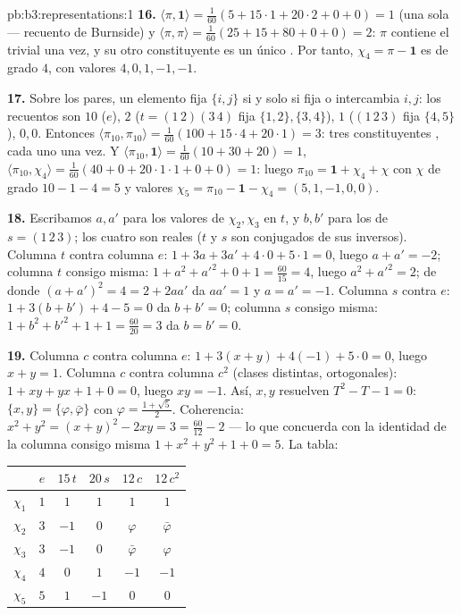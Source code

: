 \begin{solution}{pb:b3:representations:1}
\textbf{16.} $\langle\pi, \mathbf 1\rangle = \frac1{60}(5 +
15\cdot1 + 20\cdot2 + 0 + 0) = 1$ (una sola
 --- recuento de Burnside) y
$\langle\pi, \pi\rangle = \frac1{60}(25 + 15 + 80 +
0 + 0) = 2$: $\pi$ contiene el
 trivial una vez, y
su otro constituyente es un único
. Por tanto,
$\chi_4 = \pi
- \mathbf 1$ es  de
grado $4$, con valores $4, 0,
1, -1, -1$.

\textbf{17.} Sobre los pares, un elemento fija $\{i,j\}$ si y solo si
fija o intercambia $i, j$: los recuentos son $10$ ($e$), $2$ ($t =
(1\,2)(3\,4)$ fija $\{1,2\}, \{3,4\}$), $1$ ($(1\,2\,3)$ fija
$\{4,5\}$), $0, 0$. Entonces $\langle\pi_{10},
\pi_{10}\rangle = \frac1{60}(100 + 15\cdot4 + 20\cdot1) = 3$: tres
constituyentes , cada
uno una vez. Y
$\langle\pi_{10}, \mathbf 1\rangle = \frac1{60}(10 + 30 + 20)
= 1$, $\langle\pi_{10}, \chi_4\rangle = \frac1{60}(40 + 0 +
20\cdot1\cdot1 + 0 + 0) = 1$: luego $\pi_{10} = \mathbf 1 + \chi_4
+ \chi$ con $\chi$  de
grado $10 - 1 - 4 = 5$ y valores
$\chi_5 = \pi_{10} - \mathbf 1 - \chi_4 = (5, 1, -1, 0,
0)$.

\textbf{18.} Escribamos $a, a'$ para los valores de $\chi_2, \chi_3$ en
$t$, y $b, b'$ para los de $s = (1\,2\,3)$; los cuatro son reales ($t$ y
$s$ son conjugados de sus inversos). Columna $t$ contra columna $e$:
$1 + 3a + 3a' + 4\cdot0 + 5\cdot1 = 0$, luego $a + a'
= -2$; columna $t$ consigo misma: $1 + a^2 + a'^2 + 0 + 1 =
\frac{60}{15} = 4$, luego $a^2 + a'^2 = 2$; de donde $(a + a')^2 = 4
= 2 + 2aa'$ da $aa' = 1$ y $a = a' = -1$. Columna $s$ contra $e$:
$1 + 3(b + b') + 4 - 5 = 0$ da $b + b' = 0$; columna $s$ consigo misma:
$1 + b^2 + b'^2 + 1 + 1 = \frac{60}
{20} = 3$ da $b = b' = 0$.

\textbf{19.} Columna $c$ contra columna $e$: $1 + 3(x + y) +
4(-1) + 5\cdot0 = 0$, luego $x + y = 1$. Columna $c$ contra columna
$c^2$ (clases distintas, ortogonales): $1 + xy + yx + 1
+ 0 = 0$, luego $xy = -1$. Así, $x, y$ resuelven $T^2 - T - 1 = 0$:
$\{x, y\} = \{\varphi, \bar\varphi\}$ con $\varphi = \frac{1 +
\sqrt5}2$. Coherencia: $x^2 + y^2 = (x+y)^2 - 2xy = 3 =
\frac{60}{12} - 2$ --- lo que concuerda con la identidad de la columna
consigo misma $1 +
x^2 + y^2 + 1 + 0 = 5$. La tabla:
\begin{center}
\begin{tabular}{c|ccccc}
 & $e$ & $15\,t$ & $20\,s$ & $12\,c$ & $12\,c^2$\\
\hline
$\chi_1$ & $1$ & $1$ & $1$ & $1$ & $1$\\
$\chi_2$ & $3$ & $-1$ & $0$ & $\varphi$ & $\bar\varphi$\\
$\chi_3$ & $3$ & $-1$ & $0$ & $\bar\varphi$ & $\varphi$\\
$\chi_4$ & $4$ & $0$ & $1$ & $-1$ & $-1$\\
$\chi_5$ & $5$ & $1$ & $-1$ & $0$ & $0$\\
\end{tabular}
\end{center}


\end{solution}
